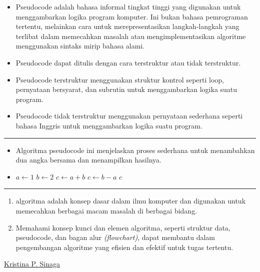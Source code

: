 \documentclass[12pt,preprintnumbers,amsmath,amssymb,nofootinbib,superscriptaddress]{revtex4-1}
\begin{document}
\begin{itemize}
    \item Pseudocode adalah bahasa informal tingkat tinggi yang digunakan untuk menggambarkan logika program komputer. Ini bukan bahasa pemrograman tertentu, melainkan cara untuk merepresentasikan langkah-langkah yang terlibat dalam memecahkan masalah atau mengimplementasikan algoritme menggunakan sintaks mirip bahasa alami.
    \item Pseudocode dapat ditulis dengan cara terstruktur atau tidak terstruktur. 
    \item Pseudocode terstruktur menggunakan struktur kontrol seperti loop, pernyataan bersyarat, dan subrutin untuk menggambarkan logika suatu program.
   \item Pseudocode tidak terstruktur menggunakan pernyataan sederhana seperti bahasa Inggris untuk menggambarkan logika suatu program.
\end{itemize}


\vspace{1cm}

\newpage

\label{Ueff}
\vspace{-0.7cm}
\vspace{-0.2cm}\hrule

\vspace{0.7cm}
\begin{itemize}
    \item Algoritma pseudocode ini menjelaskan proses sederhana untuk menambahkan dua angka bersama dan menampilkan hasilnya.
    \item \begin{algorithmic}[1]
  \State $a \gets 1$
    \State $b \gets 2$
      \State $c \gets a + b$
    \Else
      \State $c \gets b - a$
    \EndIf
  \EndIf
  \State \Return $c$
\end{algorithmic}
\end{itemize}


\vspace{1cm}

\label{Ueff}
\vspace{-0.7cm}
\vspace{-0.2cm}\hrule

\vspace{2cm}

\begin{enumerate}
    \item algoritma adalah konsep dasar dalam ilmu komputer dan digunakan untuk memecahkan berbagai macam masalah di berbagai bidang. 
    \item Memahami konsep kunci dan elemen algoritma, seperti struktur data, pseudocode, dan bagan alur \textit{(flowchart)}, dapat membantu dalam pengembangan algoritme yang efisien dan efektif untuk tugas tertentu.
\end{enumerate}

\vspace{1cm}

\vspace{\fill}
\centering
\href{https://kpnaga08.github.io/}{Kristina P. Sinaga}
\end{document}
